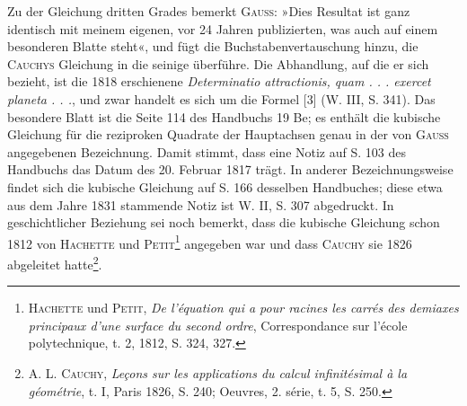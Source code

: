 \par
Zu der Gleichung dritten Grades bemerkt \textsc{Gauss}: »Dies Resultat ist ganz
identisch mit meinem eigenen, vor 24 Jahren publizierten, was auch auf einem
\clearpage{}\setcounter{footnote}{0}
\noindent besonderen Blatte steht«, und fügt die Buchstabenvertauschung hinzu, die
\textsc{Cauchys} Gleichung in die seinige überführe. Die Abhandlung, auf die er
sich bezieht, ist die 1818 erschienene \textit{Determinatio attractionis, quam . . . exercet
planeta . . .}, und zwar handelt es sich um die Formel [3] (W. III, S. 341).
Das besondere Blatt ist die Seite 114 des Handbuchs 19 Be; es enthält die
kubische Gleichung für die reziproken Quadrate der Hauptachsen genau in
der von \textsc{Gauss} angegebenen Bezeichnung. Damit stimmt, dass eine Notiz auf
S. 103 des Handbuchs das Datum des 20. Februar 1817 trägt. In anderer
Bezeichnungsweise findet sich die kubische Gleichung auf S. 166 desselben
Handbuches; diese etwa aus dem Jahre 1831 stammende Notiz ist W. II,
S. 307 abgedruckt. In geschichtlicher Beziehung sei noch bemerkt, dass die
kubische Gleichung schon 1812 von \textsc{Hachette} und \textsc{Petit}\footnote{\textsc{Hachette} und \textsc{Petit}, \textit{De l’équation qui a pour racines les carrés des demiaxes principaux d’une surface du second ordre}, Correspondance sur l’école polytechnique, t. 2, 1812, S. 324, 327.} angegeben war
und dass \textsc{Cauchy} sie 1826 abgeleitet hatte\footnote{A. L. \textsc{Cauchy}, \textit{Leçons sur les applications du calcul infinitésimal à la géométrie}, t. I, Paris 1826, S. 240; Oeuvres, 2. série, t. 5, S. 250.}.
\clearpage\endgroup
